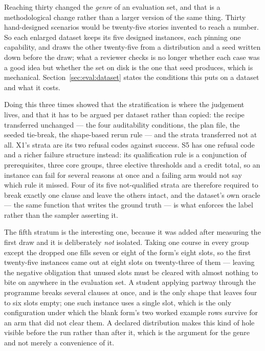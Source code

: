 Reaching thirty changed the \emph{genre} of an evaluation set, and that is a methodological
change rather than a larger version of the same thing. Thirty hand-designed scenarios would
be twenty-five stories invented to reach a number. So each enlarged dataset keeps its five
designed instances, each pinning one capability, and draws the other twenty-five from a
distribution and a seed written down before the draw; what a reviewer checks is no longer
whether each case was a good idea but whether the set on disk is the one that seed produces,
which is mechanical. Section~\ref{sec:eval:dataset} states the conditions this puts on a
dataset and what it costs.

Doing this three times showed that the stratification is where the judgement lives, and that
it has to be argued per dataset rather than copied: the recipe transferred unchanged --- the
four auditability conditions, the plan file, the seeded tie-break, the shape-based rerun rule
--- and the strata transferred not at all. X1's strata are its two refusal codes against
success. S5 has one refusal code and a richer failure structure instead: its
qualification rule is a conjunction of prerequisites, three core groups, three elective
thresholds and a credit total, so an instance can fail for several reasons at once and a
failing arm would not say which rule it missed. Four of its five not-qualified strata are
therefore required to break exactly one clause and leave the others intact, and the
dataset's own oracle --- the same function that writes the ground truth --- is what enforces
the label rather than the sampler asserting it.

The fifth stratum is the interesting one, because it was added after measuring the first
draw and it is deliberately \emph{not} isolated. Taking one course in every group except the
dropped one fills seven or eight of the form's eight slots, so the first twenty-five
instances came out at eight slots on twenty-three of them --- leaving the negative
obligation that unused slots must be cleared with almost nothing to bite on anywhere in the
evaluation set. A student applying partway through the programme breaks several clauses at
once, and is the only shape that leaves four to six slots empty; one such instance uses a
single slot, which is the only configuration under which the blank form's two worked example
rows survive for an arm that did not clear them. A declared distribution makes this kind of
hole visible before the run rather than after it, which is the argument for the genre and
not merely a convenience of it.

